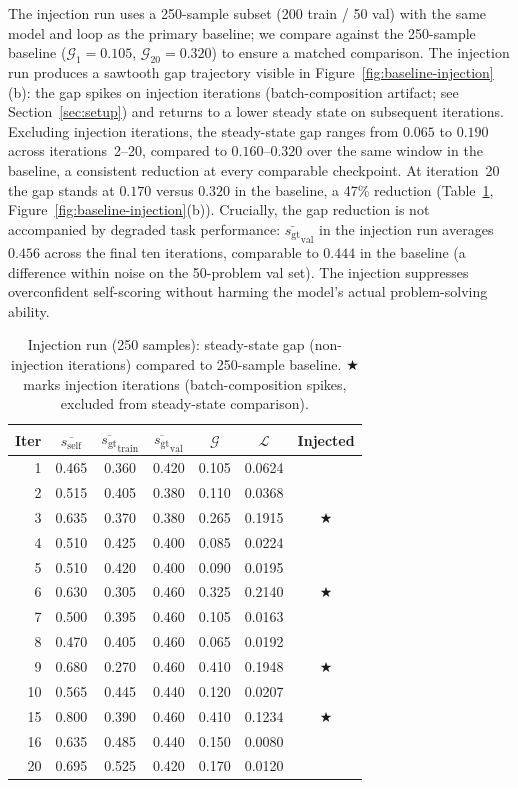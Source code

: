 \documentclass{article}
\newcommand{\gap}{\mathcal{G}}          %
\newcommand{\self}{s_{\text{self}}}     %
\newcommand{\gt}{s_{\text{gt}}}         %
\begin{document}
The injection run uses a 250-sample subset (200 train / 50 val) with the
same model and loop as the primary baseline; we compare against the
250-sample baseline ($\gap_1 = 0.105$, $\gap_{20} = 0.320$) to ensure a
matched comparison.
The injection run produces a sawtooth gap trajectory visible in
Figure~\ref{fig:baseline-injection}(b): the gap spikes on injection iterations
(batch-composition artifact; see Section~\ref{sec:setup}) and returns to a
lower steady state on subsequent iterations.
Excluding injection iterations, the steady-state gap ranges from $0.065$ to
$0.190$ across iterations~2--20, compared to $0.160$--$0.320$ over the same
window in the baseline, a consistent reduction at every comparable checkpoint.
At iteration~20 the gap stands at $0.170$ versus $0.320$ in the baseline,
a 47\% reduction (Table~\ref{tab:injection}, Figure~\ref{fig:baseline-injection}(b)).
Crucially, the gap reduction is not accompanied by degraded task performance:
$\bar{\gt}_\text{val}$ in the injection run averages $0.456$ across the final
ten iterations, comparable to $0.444$ in the baseline (a difference within
noise on the 50-problem val set).
The injection suppresses overconfident self-scoring without harming the
model's actual problem-solving ability.

\begin{table}[h]
\centering
\caption{Injection run (250 samples): steady-state gap (non-injection iterations) compared
to 250-sample baseline. $\bigstar$ marks injection iterations (batch-composition spikes, excluded
from steady-state comparison).}
\label{tab:injection}
\small
\begin{tabular}{rcccccc}
\toprule
Iter & $\overline{\self}$ & $\overline{\gt}_\text{train}$ & $\overline{\gt}_\text{val}$ & $\gap$ & $\mathcal{L}$ & Injected \\
\midrule
1  & 0.465 & 0.360 & 0.420 & 0.105 & 0.0624 &   \\
2  & 0.515 & 0.405 & 0.380 & 0.110 & 0.0368 &   \\
3  & 0.635 & 0.370 & 0.380 & 0.265 & 0.1915 & $\bigstar$ \\
4  & 0.510 & 0.425 & 0.400 & 0.085 & 0.0224 &   \\
5  & 0.510 & 0.420 & 0.400 & 0.090 & 0.0195 &   \\
6  & 0.630 & 0.305 & 0.460 & 0.325 & 0.2140 & $\bigstar$ \\
7  & 0.500 & 0.395 & 0.460 & 0.105 & 0.0163 &   \\
8  & 0.470 & 0.405 & 0.460 & 0.065 & 0.0192 &   \\
9  & 0.680 & 0.270 & 0.460 & 0.410 & 0.1948 & $\bigstar$ \\
10 & 0.565 & 0.445 & 0.440 & 0.120 & 0.0207 &   \\
15 & 0.800 & 0.390 & 0.460 & 0.410 & 0.1234 & $\bigstar$ \\
16 & 0.635 & 0.485 & 0.440 & 0.150 & 0.0080 &   \\
20 & 0.695 & 0.525 & 0.420 & 0.170 & 0.0120 &   \\
\bottomrule
\end{tabular}
\end{table}
\end{document}
